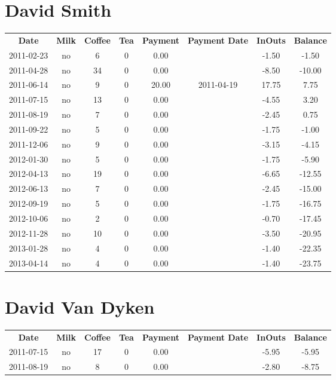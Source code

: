 \section{David Smith}

\begin{center}
\begin{tabular}{cccccccc}
\textbf{Date} & \textbf{Milk} & \textbf{Coffee} & \textbf{Tea} & \textbf{Payment} & \textbf{Payment Date} & \textbf{InOuts} & \textbf{Balance} \\
2011-02-23 & no &  6 & 0 &  0.00 &  & -1.50 &  -1.50\\ 
2011-04-28 & no & 34 & 0 &  0.00 &  & -8.50 & -10.00\\ 
2011-06-14 & no &  9 & 0 & 20.00 & 2011-04-19 & 17.75 &   7.75\\ 
2011-07-15 & no & 13 & 0 &  0.00 &  & -4.55 &   3.20\\ 
2011-08-19 & no &  7 & 0 &  0.00 &  & -2.45 &   0.75\\ 
2011-09-22 & no &  5 & 0 &  0.00 &  & -1.75 &  -1.00\\ 
2011-12-06 & no &  9 & 0 &  0.00 &  & -3.15 &  -4.15\\ 
2012-01-30 & no &  5 & 0 &  0.00 &  & -1.75 &  -5.90\\ 
2012-04-13 & no & 19 & 0 &  0.00 &  & -6.65 & -12.55\\ 
2012-06-13 & no &  7 & 0 &  0.00 &  & -2.45 & -15.00\\ 
2012-09-19 & no &  5 & 0 &  0.00 &  & -1.75 & -16.75\\ 
2012-10-06 & no &  2 & 0 &  0.00 &  & -0.70 & -17.45\\ 
2012-11-28 & no & 10 & 0 &  0.00 &  & -3.50 & -20.95\\ 
2013-01-28 & no &  4 & 0 &  0.00 &  & -1.40 & -22.35\\ 
2013-04-14 & no &  4 & 0 &  0.00 &  & -1.40 & -23.75
\end{tabular}
\end{center}

\section{David Van Dyken}

\begin{center}
\begin{tabular}{cccccccc}
\textbf{Date} & \textbf{Milk} & \textbf{Coffee} & \textbf{Tea} & \textbf{Payment} & \textbf{Payment Date} & \textbf{InOuts} & \textbf{Balance} \\
2011-07-15 & no & 17 & 0 & 0.00 &  & -5.95 & -5.95\\ 
2011-08-19 & no &  8 & 0 & 0.00 &  & -2.80 & -8.75
\end{tabular}
\end{center}

